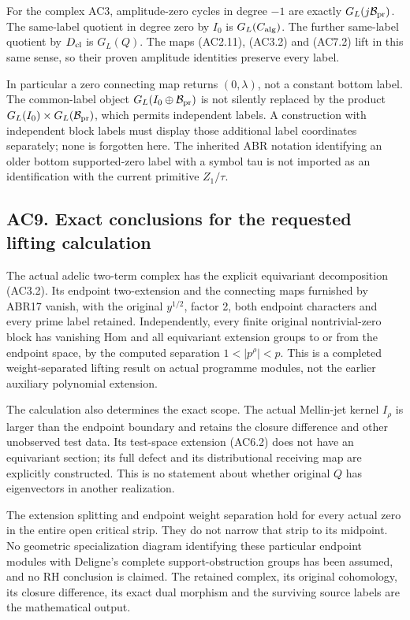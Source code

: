 For the complex AC3, amplitude-zero cycles in degree \(-1\) are exactly
\(G_L(j\mathcal B_{\rm pr})\). The same-label quotient in degree zero by
\(I_0\) is \(G_L(C_{\rm alg})\). The further same-label quotient by
\(D_{\rm cl}\) is \(G_L(Q)\). The maps (AC2.11), (AC3.2) and (AC7.2)
lift in this same sense, so their proven amplitude identities preserve
every label.

In particular a zero connecting map returns \((0,\lambda)\), not a
constant bottom label. The common-label object
\(G_L(I_0\oplus\mathcal B_{\rm pr})\) is not silently replaced by the
product \(G_L(I_0)\times G_L(\mathcal B_{\rm pr})\), which permits
independent labels. A construction with independent block labels must
display those additional label coordinates separately; none is forgotten
here. The inherited ABR notation identifying an older bottom
supported-zero label with a symbol tau is not imported as an
identification with the current primitive \(Z_1/\tau\).

\subsection{AC9. Exact conclusions for the requested lifting
calculation}\label{ac9.-exact-conclusions-for-the-requested-lifting-calculation}

The actual adelic two-term complex has the explicit equivariant
decomposition (AC3.2). Its endpoint two-extension and the connecting
maps furnished by ABR17 vanish, with the original \(y^{1/2}\), factor 2,
both endpoint characters and every prime label retained. Independently,
every finite original nontrivial-zero block has vanishing Hom and all
equivariant extension groups to or from the endpoint space, by the
computed separation \(1<|p^\rho|<p\). This is a completed
weight-separated lifting result on actual programme modules, not the
earlier auxiliary polynomial extension.

The calculation also determines the exact scope. The actual Mellin-jet
kernel \(I_\rho\) is larger than the endpoint boundary and retains the
closure difference and other unobserved test data. Its test-space
extension (AC6.2) does not have an equivariant section; its full defect
and its distributional receiving map are explicitly constructed. This is
no statement about whether original \(Q\) has eigenvectors in another
realization.

The extension splitting and endpoint weight separation hold for every
actual zero in the entire open critical strip. They do not narrow that
strip to its midpoint. No geometric specialization diagram identifying
these particular endpoint modules with Deligne's complete
support-obstruction groups has been assumed, and no RH conclusion is
claimed. The retained complex, its original cohomology, its closure
difference, its exact dual morphism and the surviving source labels are
the mathematical output.

